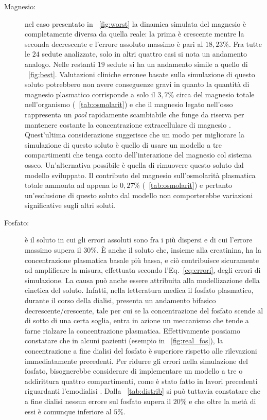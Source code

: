 \begin{description}
	\item[Magnesio:] nel caso presentato in \figurename~\ref{fig:worst} la dinamica simulata del magnesio è completamente diversa da quella reale: la prima è crescente mentre la seconda decrescente e l'errore assoluto massimo è pari al $18,23\%$. Fra tutte le $24$ sedute analizzate, solo in altri quattro casi si nota un andamento analogo. Nelle restanti $19$ sedute si ha un andamento simile a quello di \figurename~\ref{fig:best}. Valutazioni cliniche erronee basate sulla simulazione di questo soluto potrebbero non avere conseguenze gravi in quanto la quantità di magnesio plasmatico corrisponde a solo il $3,7\%$ circa del magnesio totale nell'organismo (\tablename~\ref{tab:osmolarit}) e che il magnesio legato nell'osso rappresenta un \textit{pool} rapidamente scambiabile che funge da riserva per mantenere costante la concentrazione extracellulare di magnesio \cite{guyton}. Quest'ultima considerazione suggerisce che un modo per migliorare la simulazione di questo soluto è quello di usare un modello a tre compartimenti che tenga conto dell'interazione del magnesio col sistema osseo. Un'alternativa possibile è quella di rimuovere questo soluto dal modello sviluppato. Il contributo del magnesio sull'osmolarità plasmatica totale ammonta ad appena lo $0,27\%$ (\tablename~\ref{tab:osmolarit}) e pertanto un'esclusione di questo soluto dal modello non comporterebbe variazioni significative sugli altri soluti.
	\item[Fosfato:] è il soluto in cui gli errori assoluti sono fra i più dispersi e di cui l'errore massimo supera il $30\%$. È anche il soluto che, insieme alla creatinina, ha la concentrazione plasmatica basale più bassa, e ciò contribuisce sicuramente ad amplificare la misura, effettuata secondo l'Eq.~\ref{eq:errori}, degli errori di simulazione. La causa può anche essere attribuita alla modellizazione della cinetica del soluto. Infatti, nella letteratura medica \cite{bib:fosfato} il fosfato plasmatico, durante il corso della dialisi, presenta un andamento bifasico decrescente/crescente, tale per cui se la concentrazione del fosfato scende al di sotto di una certa soglia, entra in azione un meccanismo che tende a farne rialzare la concentrazione plasmatica. Effettivamente possiamo constatare che in alcuni pazienti (esempio in \figurename~\ref{fig:real_fos}), la concentrazione a fine dialisi del fosfato è superiore rispetto alle rilevazioni immediatamente precedenti. Per ridurre gli errori nella simulazione del fosfato, bisognerebbe considerare di implementare un modello a tre o addirittura quattro compartimenti, come è stato fatto in lavori precedenti riguardanti l'emodialisi \cite{SilvTer, merulla}. Dalla \tablename~\ref{tab:distrib} si può tuttavia constatare che a fine dialisi nessun errore sul fosfato supera il $20\%$ e che oltre la metà di essi è comunque inferiore al $5\%$.

\end{description}
